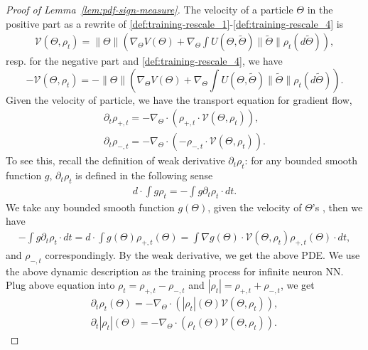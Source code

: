 \documentclass[11pt]{article}
\numberwithin{equation}{section}
\begin{document}
\begin{proof}[Proof of Lemma~\ref{lem:pdf-sign-measure}]
The velocity of a particle $\Theta$ in the positive part as a rewrite of \eqref{def:training-rescale_1}-\eqref{def:training-rescale_4} is
\begin{align}
	\mathcal{V}(\Theta,\rho_t) = \|\Theta\| \left( \nabla _{\Theta}V(\Theta)+ \nabla_{\Theta}\int U(\Theta,\tilde\Theta)\|\tilde\Theta\|\rho_t(d \tilde\Theta)\right),
\end{align}
resp. for the negative part and \eqref{def:training-rescale_4}, we have
\[ -\mathcal{V}(\Theta,\rho_t) =  -\|\Theta\| \left( \nabla_{\Theta} V(\Theta)+ \nabla_{\Theta}\int U(\Theta,\tilde\Theta)\|\tilde\Theta\|\rho_t(d \tilde\Theta)\right).\]
Given the velocity of particle, we have the transport equation for gradient flow,
\begin{align*}
	\partial_t\rho_{+,t} = - \nabla_{\Theta}\cdot\left(\rho_{+,t}\cdot\mathcal{V}(\Theta,\rho_t)\right),\\
	\partial_t\rho_{-,t} = - \nabla_{\Theta}\cdot\left(-\rho_{-,t}\cdot\mathcal{V}(\Theta,\rho_t)\right).
\end{align*}
To see this, recall the definition of weak derivative $\partial_t \rho_t$: for any bounded smooth function $g$, $\partial_t \rho_t$ is defined in the following sense
\begin{align}
	d\cdot\int g \rho_t = -\int g \partial_t \rho_t \cdot dt.
\end{align}
We take any bounded smooth function $g(\Theta)$, given the velocity of $\Theta$'s , then we have 
\begin{align}
 -\int g \partial_t \rho_t \cdot dt = d\cdot \int g(\Theta)\rho_{+,t}(\Theta) = \int \nabla g(\Theta) \cdot \mathcal{V} (\Theta,\rho_t) \rho_{+,t}(\Theta) \cdot dt,
\end{align}
and $\rho_{-,t}$ correspondingly. By the weak derivative, we get the above PDE.
We use the above dynamic description as the training process for infinite neuron NN. Plug above equation into $\rho_t = \rho_{+,t}-\rho_{-,t}$ and $|\rho_t| = \rho_{+,t}+\rho_{-,t}$, we get
\begin{align} 
	\partial_t\rho_t(\Theta) = - \nabla_{\Theta} \cdot\left(|\rho_t|(\Theta) \mathcal{V}(\Theta, \rho_t)\right), \nonumber\\
	\partial_t|\rho_t|(\Theta) = - \nabla_\Theta \cdot\left(\rho_t(\Theta) \mathcal{V}(\Theta, \rho_t) \right).\label{eq:pde_sign_char}
\end{align}
\end{proof}
\end{document}
